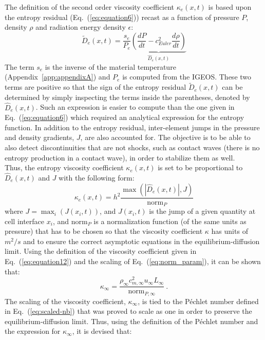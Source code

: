 \documentclass[review]{elsarticle}
\newcommand{\eqt}[1]{Eq.~(\ref{#1})}                     %
\newcommand{\app}[1]{Appendix~\ref{#1}}                     %
\newcommand{\norm}{\textrm{norm}}
\begin{document}
\noindent 
The definition of the second order viscosity coefficient $\kappa_e(x,t)$ is based upon the entropy residual (\eqt{eq:equation6}) recast as a function of pressure $P$, density $\rho$ and radiation energy density $\epsilon$:
\begin{equation}
\label{eq:equation9}
\tilde{D}_e(x,t) = \frac{s_e}{P_e} \underbrace{ \left( \frac{dP}{dt} - c_{Euler}^2 \frac{d\rho}{dt} \right)}_\textrm{$\hat{D}_e(x,t)$}
\end{equation}
The term $s_e$ is the inverse of the material temperature (\app{app:appendixA}) and $P_e$ is computed from the IGEOS. These two terms are positive so that the sign of the entropy residual $\tilde{D}_e(x,t)$ can be determined by simply inspecting the terms inside the parentheses, denoted by $\hat{D}_e(x,t)$. Such an expression is easier to compute than the one given in \eqt{eq:equation6} which required an analytical expression for the entropy function. In addition to the entropy residual, inter-element jumps in the pressure and density gradients, $J$, are also accounted for. The objective is to be able to also detect discontinuities that are not shocks, such as contact waves (there is no entropy production in a contact wave), in order to stabilize them as well. \\
Thus, the entropy viscosity coefficient $\kappa_e(x,t)$ is set to be proportional to $\hat{D}_e(x,t)$ and $J$ with the following form: 
\begin{equation}
\label{eq:equation12}
\kappa_e(x,t) = h^2 \frac{\max (|\hat{D}_e(x,t)|, J)}{\norm_P}
\end{equation} 
where $J = \max_i (J(x_i,t))$, and $J(x_i,t)$ is the jump of a given quantity at cell interface $x_i$, and $\norm_P$ is a normalization function (of the same units as pressure) that has to be chosen so that the viscosity coefficient $\kappa$ has units of $m^2/s$ and to ensure the correct asymptotic equations in the equilibrium-diffusion limit. Using the definition of the viscosity coefficient given in \eqt{eq:equation12} and the scaling of \eqt{eq:norm_param}, it can be shown that:
%
\begin{equation}
\kappa_\infty = \frac{\rho_\infty c^2_{m,\infty} u_\infty L_\infty}{\norm_{P,\infty}} \ .
\end{equation}
%
The scaling of the viscosity coefficient, $\kappa_\infty$, is tied to the P\'echlet number defined in \eqt{eq:scaled-nb} that was proved to scale as one in order to preserve the equilibrium-diffusion limit. Thus, using the definition of the P\'echlet number and the expression for $\kappa_\infty$, it is devised that:
\end{document}
